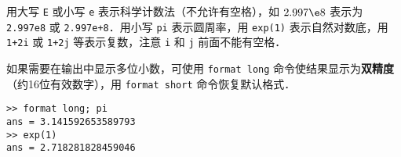 用大写 \verb|E| 或小写 \verb|e| 表示科学计数法（不允许有空格），如 $2.997\e8$ 表示为 \verb|2.997e8| 或 \verb|2.997e+8|．用小写 \verb|pi| 表示圆周率，用 \verb|exp(1)| 表示自然对数底，用 \verb|1+2i| 或 \verb|1+2j| 等表示复数，注意 \verb|i| 和 \verb|j| 前面不能有空格．

如果需要在输出中显示多位小数，可使用 \verb|format long| 命令使结果显示为\textbf{双精度}（约16位有效数字），用 \verb|format short| 命令恢复默认格式．
\begin{lstlisting}[language=matlabC]
>> format long; pi
ans = 3.141592653589793
>> exp(1)
ans = 2.718281828459046
\end{lstlisting}
